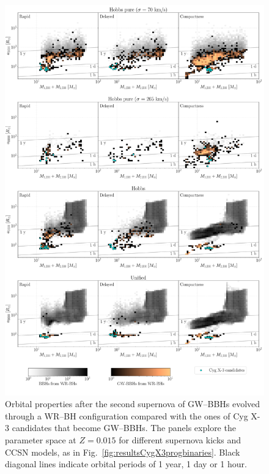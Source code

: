\documentclass[a4paper,titlepage]{book}     	%
\begin{document}
\begin{figure}[h!]
	\centering
	\includegraphics[width=\textwidth]{./images/kickcompare_rem_015.pdf}	
	\caption{Orbital properties after the second supernova of GW--BBHs evolved through a WR--BH configuration compared with the ones of Cyg X-3 candidates that become GW--BBHs. The panels explore the parameter space at $Z=0.015$ for different supernova kicks and CCSN models, as in Fig.\ \ref{fig:resultsCygX3progbinaries}. Black diagonal lines indicate orbital periods of 1 year, 1 day or 1 hour.}\label{fig:resultsCygX3rembinaries}
\end{figure}
\end{document}
